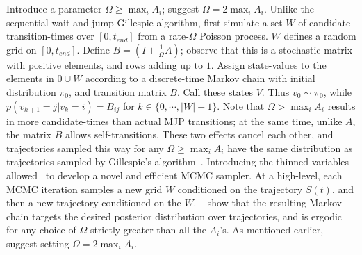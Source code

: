 Introduce a parameter $\Omega \ge \max_i A_i$;
\cite{RaoTeh13} suggest $\Omega = 2 \max_i A_i$. 
Unlike the sequential wait-and-jump Gillespie algorithm, first simulate 
a set $W$ of candidate
transition-times over $[0,t_{end}]$ from a rate-$\Omega$ 
Poisson process. $W$ %
defines a random grid on $[0,t_{end}]$.
Define $B = \left(I +\frac{1}{\Omega}A\right)$; observe that this is a
stochastic matrix with positive elements, and rows adding up to $1$.
Assign state-values to the elements in $0 \cup W$ according to a discrete-time 
Markov chain with initial distribution $\pi_0$, and transition matrix $B$.
Call these states $V$. Thus $v_0 \sim \pi_0$, while $p(v_{k+1}=j|v_k=i) = B_{ij}$
for $k \in \{0,\cdots,|W|-1\}$.
Note that $\Omega > \max_i A_i$ results in more
candidate-times than actual MJP transitions; at the same time, unlike $A$, 
the matrix $B$ allows self-transitions. These two effects cancel
each other, and trajectories sampled this way for any $\Omega \ge \max_i A_i$
have the same distribution as trajectories
sampled by Gillespie's algorithm~\cite{Jen1953,RaoTeh13}.
Introducing the thinned variables allowed~\cite{RaoTeh13} to develop
a novel and efficient MCMC sampler. At a 
high-level, each MCMC iteration 
samples a new grid $W$ conditioned on the trajectory $S(t)$, 
and then a new trajectory conditioned on the $W$. 
    ~\cite{RaoTeh13} show that the resulting Markov chain targets
    the desired posterior distribution over trajectories, and is 
    ergodic for any choice of $\Omega$ strictly greater than all the
    $A_i$'s. As mentioned earlier, \cite{RaoTeh13} suggest setting $\Omega = 2\max_i A_i$.
